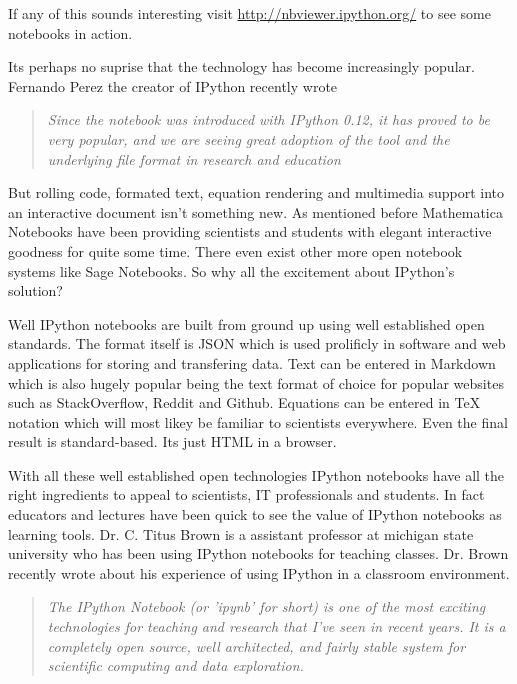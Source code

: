 \documentclass[11pt, a4paper]{article}  %
\begin{document}
\begin{multicols}{2}
If any of this sounds interesting visit \url{http://nbviewer.ipython.org/} to
see some notebooks in action. 

Its perhaps no suprise that the technology has
become increasingly popular. Fernando Perez the creator of IPython recently wrote

\begin{quote}
\textit{Since the notebook was introduced with IPython 0.12, it has proved to
be very popular, and we are seeing great adoption of the tool and the
underlying file format in research and education}
\end{quote}

But rolling code, formated text, equation rendering and multimedia support
into an interactive document isn't something new. As mentioned before
Mathematica Notebooks have been providing scientists and students with elegant
interactive goodness for quite some time. There even exist other more open
notebook systems like Sage Notebooks. So why all the excitement about
IPython's solution?

Well IPython notebooks are built from ground up using well established open
standards. The format itself is JSON which is used prolificly in software and
web applications for storing and transfering data. Text can be entered in
Markdown which is also hugely popular being the text format of choice for
popular websites such as StackOverflow, Reddit and Github. Equations can be
entered in TeX notation which will most likey be familiar to scientists
everywhere. Even the final result is standard-based. Its just HTML in a browser. 

With all these well established open technologies IPython notebooks have all
the right ingredients to appeal to scientists, IT professionals and students.
In fact educators and lectures have been quick to see the value of IPython
notebooks as learning tools. Dr. C. Titus Brown is a assistant professor at
michigan state university who has been using IPython notebooks for teaching
classes. Dr. Brown recently wrote about his experience of using IPython in a
classroom environment.

\begin{quote} 
\textit{The IPython Notebook (or 'ipynb' for short) is one of the most
exciting technologies for teaching and research that I've seen in recent
years. It is a completely open source, well architected, and fairly stable
system for scientific computing and data exploration.}
\end{quote}


\end{multicols}
\end{document}
